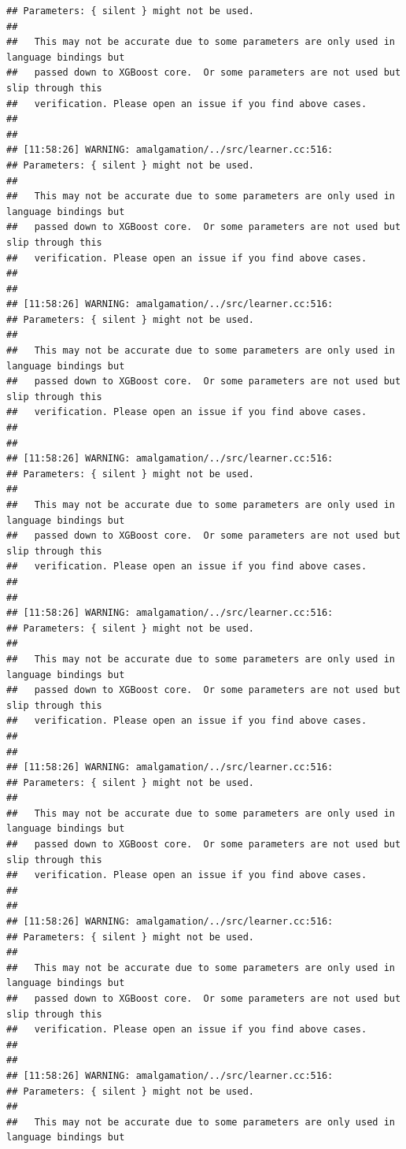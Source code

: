 \documentclass[AMS,STIX2COL]{WileyNJD-v2}\usepackage[]{graphicx}\usepackage[]{color}
\makeatletter
\newenvironment{kframe}{%
 \def\at@end@of@kframe{}%
 \ifinner\ifhmode%
  \def\at@end@of@kframe{\end{minipage}}%
  \begin{minipage}{\columnwidth}%
 \fi\fi%
 \def\FrameCommand##1{\hskip\@totalleftmargin \hskip-\fboxsep
 \colorbox{shadecolor}{##1}\hskip-\fboxsep
     \hskip-\linewidth \hskip-\@totalleftmargin \hskip\columnwidth}%
 \MakeFramed {\advance\hsize-\width
   \@totalleftmargin\z@ \linewidth\hsize
   \@setminipage}}%
 {\par\unskip\endMakeFramed%
 \at@end@of@kframe}
\newenvironment{knitrout}{}{} %
\makeatother
\begin{document}
\begin{knitrout}
\begin{kframe}
\begin{verbatim}
## Parameters: { silent } might not be used.
## 
##   This may not be accurate due to some parameters are only used in language bindings but
##   passed down to XGBoost core.  Or some parameters are not used but slip through this
##   verification. Please open an issue if you find above cases.
## 
## 
## [11:58:26] WARNING: amalgamation/../src/learner.cc:516: 
## Parameters: { silent } might not be used.
## 
##   This may not be accurate due to some parameters are only used in language bindings but
##   passed down to XGBoost core.  Or some parameters are not used but slip through this
##   verification. Please open an issue if you find above cases.
## 
## 
## [11:58:26] WARNING: amalgamation/../src/learner.cc:516: 
## Parameters: { silent } might not be used.
## 
##   This may not be accurate due to some parameters are only used in language bindings but
##   passed down to XGBoost core.  Or some parameters are not used but slip through this
##   verification. Please open an issue if you find above cases.
## 
## 
## [11:58:26] WARNING: amalgamation/../src/learner.cc:516: 
## Parameters: { silent } might not be used.
## 
##   This may not be accurate due to some parameters are only used in language bindings but
##   passed down to XGBoost core.  Or some parameters are not used but slip through this
##   verification. Please open an issue if you find above cases.
## 
## 
## [11:58:26] WARNING: amalgamation/../src/learner.cc:516: 
## Parameters: { silent } might not be used.
## 
##   This may not be accurate due to some parameters are only used in language bindings but
##   passed down to XGBoost core.  Or some parameters are not used but slip through this
##   verification. Please open an issue if you find above cases.
## 
## 
## [11:58:26] WARNING: amalgamation/../src/learner.cc:516: 
## Parameters: { silent } might not be used.
## 
##   This may not be accurate due to some parameters are only used in language bindings but
##   passed down to XGBoost core.  Or some parameters are not used but slip through this
##   verification. Please open an issue if you find above cases.
## 
## 
## [11:58:26] WARNING: amalgamation/../src/learner.cc:516: 
## Parameters: { silent } might not be used.
## 
##   This may not be accurate due to some parameters are only used in language bindings but
##   passed down to XGBoost core.  Or some parameters are not used but slip through this
##   verification. Please open an issue if you find above cases.
## 
## 
## [11:58:26] WARNING: amalgamation/../src/learner.cc:516: 
## Parameters: { silent } might not be used.
## 
##   This may not be accurate due to some parameters are only used in language bindings but

\end{verbatim}
\end{kframe}
\end{knitrout}
\end{document}
